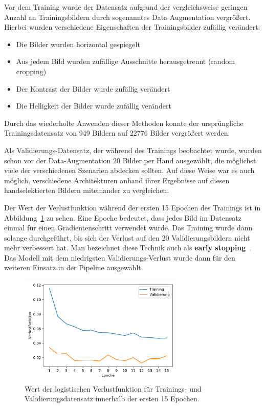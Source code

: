 Vor dem Training wurde der Datensatz aufgrund der vergleichsweise
geringen Anzahl an Trainingsbildern durch sogenanntes Data Augmentation
vergr\"o{\ss}ert. Hierbei wurden verschiedene Eigenschaften der
Trainingsbilder zuf\"allig ver\"andert:
\begin{itemize}
    \item Die Bilder wurden horizontal gespiegelt
    \item Aus jedem Bild wurden zuf\"allige Ausschnitte herausgetrennt (random cropping)
    \item Der Kontrast der Bilder wurde zuf\"allig ver\"andert
    \item Die Helligkeit der Bilder wurde zuf\"allig ver\"andert
\end{itemize}
Durch das wiederholte Anwenden dieser Methoden konnte der urspr\"ungliche
Trainingsdatensatz von 949 Bildern auf 22776 Bilder vergr\"o{\ss}ert werden.

Als Validierungs-Datensatz, der w\"ahrend des Trainings beobachtet wurde,
wurden schon vor der Data-Augmentation 20 Bilder per Hand ausgew\"ahlt,
die m\"oglichst viele der verschiedenen Szenarien abdecken sollten.
Auf diese Weise war es auch m\"oglich, verschiedene Architekturen
anhand ihrer Ergebnisse auf diesen handselektierten Bildern
miteinander zu vergleichen.

Der Wert der Verlustfunktion w\"ahrend der ersten 15 Epochen des Trainings ist in
Abbildung~\ref{fig:training-loss} zu sehen.
Eine Epoche bedeutet, dass jedes Bild im Datensatz einmal f\"ur einen
Gradientenschritt verwendet wurde.
Das Training wurde dann solange durchgef\"uhrt, bis sich der Verlust auf den
20 Validierungsbildern nicht mehr verbessert hat. Man bezeichnet diese
Technik auch als \textbf{early stopping}~\cite{Goodfellow-et-al-2016}.
Das Modell mit dem niedrigsten Validierungs-Verlust wurde dann f\"ur
den weiteren Einsatz in der Pipeline ausgew\"ahlt.

\begin{figure}
    \centering
    \includegraphics[width=0.7\textwidth]{abbildungen/training_plot}
    \caption[Trainings- und Validierungsverlust]{Wert der logistischen Verlustfunktion f\"ur Trainings- und Validierungsdatensatz
        innerhalb der ersten 15 Epochen.}
    \label{fig:training-loss}
\end{figure}

